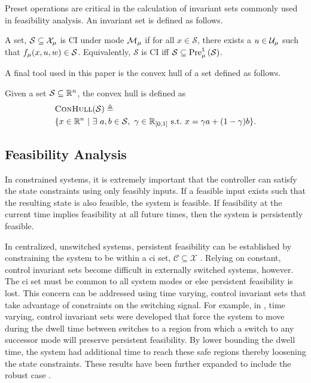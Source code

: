Preset operations are critical in the calculation of invariant sets commonly used in feasibility analysis. An invariant set is defined as follows.
\begin{definition}\label{def:ci_set}
A set, $\mathcal{S}\subseteq\xcon[\modeidx]$ is CI under mode $\mode{\modeidx}$ if for all $x\in\mathcal{S}$, there exists a $u\in\ucon[\modeidx]$ such that $f_{\mu}(x,u,w)\in\mathcal{S}$. Equivalently, $\mathcal{S}$ is CI iff $\mathcal{S}\subseteq\Pre[\modeidx][1]{\mathcal{S}}$.
\end{definition}

A final tool used in this paper is the convex hull of a set defined as follows.
\begin{definition}
Given a set $\mathcal{S}\subseteq\mathbb{R}^n$, the convex hull is defined as 
\begin{align*}
&\Call{ConHull}{\mathcal{S}}\triangleq\\&\{x\in\real^n\ |\ \exists\ a,b\in\mathcal{S},\ \gamma\in\real\rii{0}{1}\ \text{s.t.}\ x=\gamma a + (1-\gamma)b\}.
\end{align*}
\end{definition}
\subsection{Feasibility Analysis}
In constrained systems, it is extremely important that the controller can satisfy the state constraints using only feasibly inputs. If a feasible input exists such that the resulting state is also feasible, the system is feasible. If feasibility at the current time implies feasibility at all future times, then the system is persistently feasible.

In centralized, unswitched systems, persistent feasibility can be established by constraining the system to be within a \ac{ci} set, $\mathcal{C}\subseteq\mathcal{X}$ \cite{Blanchini1999}. Relying on constant, control invariant sets become difficult in externally switched systems, however. The \ac{ci} set must be common to all system modes or else persistent feasibility is lost. This concern can be addressed using time varying, control invariant sets that take advantage of constraints on the switching signal. For example, in \cite{Danielson2019,Santis2004}, time varying, control invariant sets were developed that force the system to move during the dwell time between switches to a region from which a switch to any successor mode will preserve persistent feasibility. By lower bounding the dwell time, the system had additional time to reach these safe regions thereby loosening the state constraints. These results have been further expanded to include the robust case \cite{Lavaei2021}.


